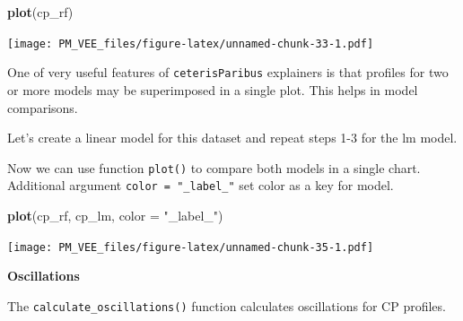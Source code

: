 \documentclass[]{book}
\newenvironment{Shaded}{\begin{snugshade}}{\end{snugshade}}
\newcommand{\DataTypeTok}[1]{\textcolor[rgb]{0.13,0.29,0.53}{#1}}
\newcommand{\KeywordTok}[1]{\textcolor[rgb]{0.13,0.29,0.53}{\textbf{#1}}}
\newcommand{\NormalTok}[1]{#1}
\newcommand{\OperatorTok}[1]{\textcolor[rgb]{0.81,0.36,0.00}{\textbf{#1}}}
\newcommand{\StringTok}[1]{\textcolor[rgb]{0.31,0.60,0.02}{#1}}
\theoremstyle{definition}
\theoremstyle{definition}
\theoremstyle{definition}
\theoremstyle{remark}
\begin{document}
\begin{Shaded}
\begin{Highlighting}[]
\KeywordTok{plot}\NormalTok{(cp_rf) }
\end{Highlighting}
\end{Shaded}

\texttt{[image: PM\_VEE\_files/figure-latex/unnamed-chunk-33-1.pdf]}

One of very useful features of \texttt{ceterisParibus} explainers is
that profiles for two or more models may be superimposed in a single
plot. This helps in model comparisons.

Let's create a linear model for this dataset and repeat steps 1-3 for
the lm model.

\begin{Shaded}
\end{Shaded}

Now we can use function \texttt{plot()} to compare both models in a
single chart. Additional argument \texttt{color\ =\ "\_label\_"} set
color as a key for model.

\begin{Shaded}
\begin{Highlighting}[]
\KeywordTok{plot}\NormalTok{(cp_rf, cp_lm, }\DataTypeTok{color =} \StringTok{"_label_"}\NormalTok{)}
\end{Highlighting}
\end{Shaded}

\texttt{[image: PM\_VEE\_files/figure-latex/unnamed-chunk-35-1.pdf]}

\textbf{Oscillations}

The \texttt{calculate\_oscillations()} function calculates oscillations
for CP profiles.
\end{document}
